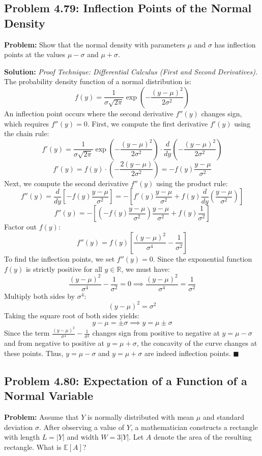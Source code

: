 \documentclass[11pt, a4paper]{article}
\theoremstyle{definition}
\theoremstyle{remark}
\newcommand{\R}{\mathbb{R}}
\newcommand{\E}{\mathbb{E}}
\begin{document}
\subsection{Problem 4.79: Inflection Points of the Normal Density}
\textbf{Problem:} Show that the normal density with parameters $\mu$ and $\sigma$ has inflection points at the values $\mu - \sigma$ and $\mu + \sigma$.

\textbf{Solution:}
\textit{Proof Technique: Differential Calculus (First and Second Derivatives).}
The probability density function of a normal distribution is:
\[ f(y) = \frac{1}{\sigma\sqrt{2\pi}} \exp\left( -\frac{(y-\mu)^2}{2\sigma^2} \right) \]
An inflection point occurs where the second derivative $f''(y)$ changes sign, which requires $f''(y) = 0$.
First, we compute the first derivative $f'(y)$ using the chain rule:
\[ f'(y) = \frac{1}{\sigma\sqrt{2\pi}} \exp\left( -\frac{(y-\mu)^2}{2\sigma^2} \right) \cdot \frac{d}{dy} \left( -\frac{(y-\mu)^2}{2\sigma^2} \right) \]
\[ f'(y) = f(y) \cdot \left( -\frac{2(y-\mu)}{2\sigma^2} \right) = -f(y) \frac{y-\mu}{\sigma^2} \]
Next, we compute the second derivative $f''(y)$ using the product rule:
\[ f''(y) = \frac{d}{dy} \left[ -f(y) \frac{y-\mu}{\sigma^2} \right] = - \left[ f'(y) \frac{y-\mu}{\sigma^2} + f(y) \frac{d}{dy} \left( \frac{y-\mu}{\sigma^2} \right) \right] \]
\[ f''(y) = - \left[ \left( -f(y) \frac{y-\mu}{\sigma^2} \right) \frac{y-\mu}{\sigma^2} + f(y) \frac{1}{\sigma^2} \right] \]
Factor out $f(y)$:
\[ f''(y) = f(y) \left[ \frac{(y-\mu)^2}{\sigma^4} - \frac{1}{\sigma^2} \right] \]
To find the inflection points, we set $f''(y) = 0$. Since the exponential function $f(y)$ is strictly positive for all $y \in \R$, we must have:
\[ \frac{(y-\mu)^2}{\sigma^4} - \frac{1}{\sigma^2} = 0 \implies \frac{(y-\mu)^2}{\sigma^4} = \frac{1}{\sigma^2} \]
Multiply both sides by $\sigma^4$:
\[ (y-\mu)^2 = \sigma^2 \]
Taking the square root of both sides yields:
\[ y - \mu = \pm \sigma \implies y = \mu \pm \sigma \]
Since the term $\frac{(y-\mu)^2}{\sigma^4} - \frac{1}{\sigma^2}$ changes sign from positive to negative at $y = \mu - \sigma$ and from negative to positive at $y = \mu + \sigma$, the concavity of the curve changes at these points. Thus, $y = \mu - \sigma$ and $y = \mu + \sigma$ are indeed inflection points.
$\blacksquare$

\subsection{Problem 4.80: Expectation of a Function of a Normal Variable}
\textbf{Problem:} Assume that $Y$ is normally distributed with mean $\mu$ and standard deviation $\sigma$. After observing a value of $Y$, a mathematician constructs a rectangle with length $L = |Y|$ and width $W = 3|Y|$. Let $A$ denote the area of the resulting rectangle. What is $\E[A]$?
\end{document}
